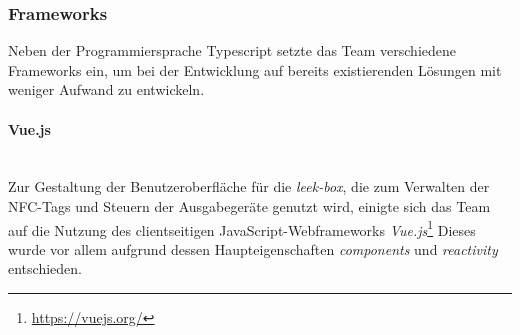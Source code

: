 \documentclass[10pt, a4paper]{article}
\begin{document}
\subsubsection{Frameworks}
Neben der Programmiersprache Typescript setzte das Team verschiedene Frameworks ein, um bei der Entwicklung auf bereits existierenden Lösungen mit weniger Aufwand zu entwickeln.

\paragraph*{Vue.js} $~$ \\
Zur Gestaltung der Benutzeroberfläche für die \textit{leek-box},
 die zum Verwalten der NFC-Tags und Steuern der Ausgabegeräte genutzt wird,
 einigte sich das Team auf die Nutzung des
clientseitigen JavaScript-Webframeworks \textit{Vue.js}\footnote{\raggedright\url{https://vuejs.org/}}
Dieses wurde vor allem aufgrund dessen Haupteigenschaften \textit{components} und \textit{reactivity} entschieden.
\end{document}
